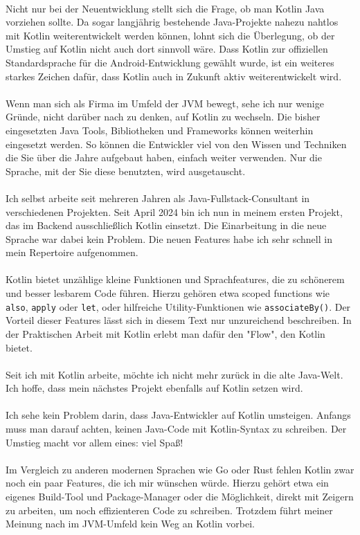 \documentclass[11pt]{article}
\begin{document}
    \\
    Nicht nur bei der Neuentwicklung stellt sich die Frage, ob man Kotlin Java vorziehen sollte.
    Da sogar langjährig bestehende Java-Projekte nahezu nahtlos mit Kotlin weiterentwickelt werden können, lohnt sich die Überlegung, ob der Umstieg auf Kotlin nicht auch dort sinnvoll wäre.
    Dass Kotlin zur offiziellen Standardsprache für die Android-Entwicklung gewählt wurde, ist ein weiteres starkes Zeichen dafür, dass Kotlin auch in Zukunft aktiv weiterentwickelt wird.\\
    \\
    Wenn man sich als Firma im Umfeld der JVM bewegt, sehe ich nur wenige Gründe, nicht darüber nach zu denken, auf Kotlin zu wechseln.
    Die bisher eingesetzten Java Tools, Bibliotheken und Frameworks können weiterhin eingesetzt werden.
    So können die Entwickler viel von den Wissen und Techniken die Sie über die Jahre aufgebaut haben, einfach weiter verwenden.
    Nur die Sprache, mit der Sie diese benutzten, wird ausgetauscht.\\
    \\
    Ich selbst arbeite seit mehreren Jahren als Java-Fullstack-Consultant in verschiedenen Projekten.
    Seit April 2024 bin ich nun in meinem ersten Projekt, das im Backend ausschließlich Kotlin einsetzt.
    Die Einarbeitung in die neue Sprache war dabei kein Problem.
    Die neuen Features habe ich sehr schnell in mein Repertoire aufgenommen.\\
    \\
    Kotlin bietet unzählige kleine Funktionen und Sprachfeatures, die zu schönerem und besser lesbarem Code führen.
    Hierzu gehören etwa scoped functions wie \texttt{also}, \texttt{apply} oder \texttt{let}, oder hilfreiche Utility-Funktionen wie \texttt{associateBy()}.
    Der Vorteil dieser Features lässt sich in diesem Text nur unzureichend beschreiben.
    In der Praktischen Arbeit mit Kotlin erlebt man dafür den "Flow", den Kotlin bietet.\\
    \\
    Seit ich mit Kotlin arbeite, möchte ich nicht mehr zurück in die alte Java-Welt.
    Ich hoffe, dass mein nächstes Projekt ebenfalls auf Kotlin setzen wird.\\
    \\
    Ich sehe kein Problem darin, dass Java-Entwickler auf Kotlin umsteigen.
    Anfangs muss man darauf achten, keinen Java-Code mit Kotlin-Syntax zu schreiben.
    Der Umstieg macht vor allem eines: viel Spaß!\\
    \\
    Im Vergleich zu anderen modernen Sprachen wie Go oder Rust fehlen Kotlin zwar noch ein paar Features, die ich mir wünschen würde.
    Hierzu gehört etwa ein eigenes Build-Tool und Package-Manager oder die Möglichkeit, direkt mit Zeigern zu arbeiten, um noch effizienteren Code zu schreiben.
    Trotzdem führt meiner Meinung nach im JVM-Umfeld kein Weg an Kotlin vorbei.\\
\end{document}
